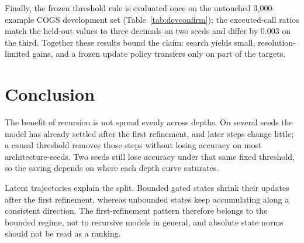 \documentclass[11pt]{article}
\begin{document}
\begin{table}[t]
\centering
\footnotesize
\setlength{\tabcolsep}{2.5pt}
\caption{\textbf{One-shot confirmation on untouched data.} Official COGS development set ($n{=}3{,}000$; group-cluster paired bootstrap, 20{,}000 resamples), evaluated once with the frozen preregistered threshold and each seed's frozen best fixed depth. The compute ratios match the held-out-fold values (0.2575 / 0.2570 / 0.5212) for seeds 0--1 to the third decimal; seed 2 differs by 0.003 (0.6\% relative), so the executed-call savings transfer across splits to within a fraction of a percent.}
\label{tab:devconfirm}
\end{table} Finally, the frozen threshold rule is evaluated once on the untouched 3{,}000-example COGS development set (Table~\ref{tab:devconfirm}); the executed-call ratios match the held-out values to three decimals on two seeds and differ by 0.003 on the third. Together these results bound the claim: search yields small, resolution-limited gains, and a frozen update policy transfers only on part of the targets.

\section{Conclusion}
\label{sec:conclusion}
The benefit of recursion is not spread evenly across depths. On several seeds the model has already settled after the first refinement, and later steps change little; a causal threshold removes those steps without losing accuracy on most architecture-seeds. Two seeds still lose accuracy under that same fixed threshold, so the saving depends on where each depth curve saturates.

Latent trajectories explain the split. Bounded gated states shrink their updates after the first refinement, whereas unbounded states keep accumulating along a consistent direction. The first-refinement pattern therefore belongs to the bounded regime, not to recursive models in general, and absolute state norms should not be read as a ranking.
\end{document}
